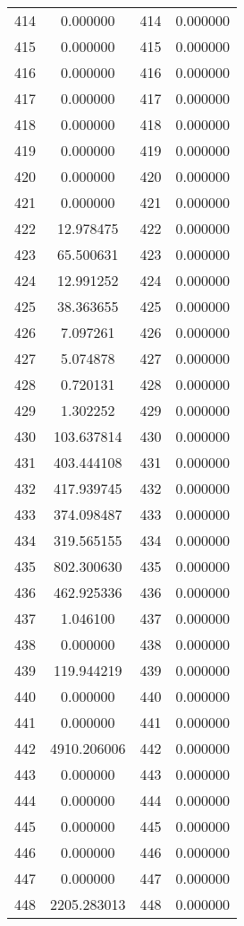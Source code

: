 \documentclass[12pt]{article}
\begin{document}
\begin{longtable}{@{}cccc@{}}
414 & 0.000000 & 414 & 0.000000 \\
415 & 0.000000 & 415 & 0.000000 \\
416 & 0.000000 & 416 & 0.000000 \\
417 & 0.000000 & 417 & 0.000000 \\
418 & 0.000000 & 418 & 0.000000 \\
419 & 0.000000 & 419 & 0.000000 \\
420 & 0.000000 & 420 & 0.000000 \\
421 & 0.000000 & 421 & 0.000000 \\
422 & 12.978475 & 422 & 0.000000 \\
423 & 65.500631 & 423 & 0.000000 \\
424 & 12.991252 & 424 & 0.000000 \\
425 & 38.363655 & 425 & 0.000000 \\
426 & 7.097261 & 426 & 0.000000 \\
427 & 5.074878 & 427 & 0.000000 \\
428 & 0.720131 & 428 & 0.000000 \\
429 & 1.302252 & 429 & 0.000000 \\
430 & 103.637814 & 430 & 0.000000 \\
431 & 403.444108 & 431 & 0.000000 \\
432 & 417.939745 & 432 & 0.000000 \\
433 & 374.098487 & 433 & 0.000000 \\
434 & 319.565155 & 434 & 0.000000 \\
435 & 802.300630 & 435 & 0.000000 \\
436 & 462.925336 & 436 & 0.000000 \\
437 & 1.046100 & 437 & 0.000000 \\
438 & 0.000000 & 438 & 0.000000 \\
439 & 119.944219 & 439 & 0.000000 \\
440 & 0.000000 & 440 & 0.000000 \\
441 & 0.000000 & 441 & 0.000000 \\
442 & 4910.206006 & 442 & 0.000000 \\
443 & 0.000000 & 443 & 0.000000 \\
444 & 0.000000 & 444 & 0.000000 \\
445 & 0.000000 & 445 & 0.000000 \\
446 & 0.000000 & 446 & 0.000000 \\
447 & 0.000000 & 447 & 0.000000 \\
448 & 2205.283013 & 448 & 0.000000 \\

\end{longtable}
\end{document}
